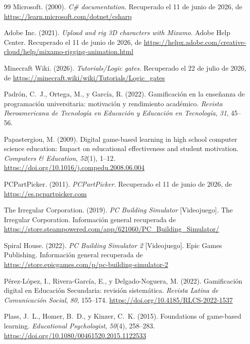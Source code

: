 \documentclass[a4paper,12pt]{article}
\begin{document}
\begin{thebibliography}{99}
Microsoft. (2000). \textit{C\# documentation}. Recuperado el 11 de junio de 2026, de \url{https://learn.microsoft.com/dotnet/csharp}

Adobe Inc. (2021). \textit{Upload and rig 3D characters with Mixamo}. Adobe Help Center. Recuperado el 11 de junio de 2026, de \url{https://helpx.adobe.com/creative-cloud/help/mixamo-rigging-animation.html}

Minecraft Wiki. (2026). \textit{Tutorials/Logic gates}. Recuperado el 22 de julio de 2026, de \url{https://minecraft.wiki/wiki/Tutorials/Logic_gates}

Padrón, C.~J., Ortega, M., y García, R. (2022). Gamificación en la enseñanza de programación universitaria: motivación y rendimiento académico. \textit{Revista Iberoamericana de Tecnología en Educación y Educación en Tecnología}, \textit{31}, 45--56.

Papastergiou, M. (2009). Digital game-based learning in high school computer science education: Impact on educational effectiveness and student motivation. \textit{Computers \& Education}, \textit{52}(1), 1--12. \url{https://doi.org/10.1016/j.compedu.2008.06.004}

PCPartPicker. (2011). \textit{PCPartPicker}. Recuperado el 11 de junio de 2026, de \url{https://es.pcpartpicker.com}

The Irregular Corporation. (2019). \textit{PC Building Simulator} [Videojuego]. The Irregular Corporation. Información general recuperada de \url{https://store.steampowered.com/app/621060/PC_Building_Simulator/}

Spiral House. (2022). \textit{PC Building Simulator 2} [Videojuego]. Epic Games Publishing. Información general recuperada de \url{https://store.epicgames.com/p/pc-building-simulator-2}

Pérez-López, I., Rivera-García, E., y Delgado-Noguera, M. (2022). Gamificación digital en Educación Secundaria: revisión sistemática. \textit{Revista Latina de Comunicación Social}, \textit{80}, 155--174. \url{https://doi.org/10.4185/RLCS-2022-1537}

Plass, J.~L., Homer, B.~D., y Kinzer, C.~K. (2015). Foundations of game-based learning. \textit{Educational Psychologist}, \textit{50}(4), 258--283. \url{https://doi.org/10.1080/00461520.2015.1122533}


\end{thebibliography}
\end{document}
